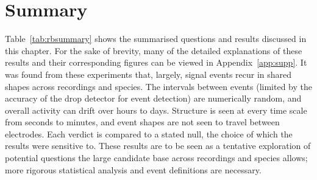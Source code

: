 \section{Summary}

Table~\ref{tab:rbsummary} shows the summarised questions and results discussed in this chapter. For the sake of brevity, many of the detailed explanations of these results and their corresponding figures can be viewed in Appendix~\ref{app:supp}. It was found from these experiments that, largely, signal events recur in shared shapes across recordings and species. The intervals between events (limited by the accuracy of the drop detector for event detection) are numerically random, and overall activity can drift over hours to days. Structure is seen at every time scale from seconds to minutes, and event shapes are not seen to travel between electrodes. Each verdict is compared to a stated null, the choice of which the results were sensitive to. These results are to be seen as a tentative exploration of potential questions the large candidate base across recordings and species allows; more rigorous statistical analysis and event definitions are necessary.

